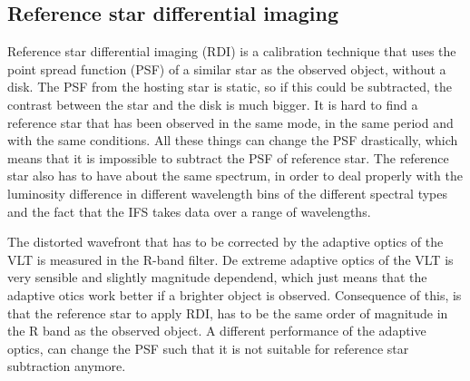 \documentclass[twoside,single]{lion-msc}
\begin{document}



\clearpage
\subsection*{Reference star differential imaging}
Reference star differential imaging (RDI) is a calibration technique that uses the point spread function (PSF) of a similar star as the observed object, without a disk. The PSF from the hosting star is static, so if this could be subtracted, the contrast between the star and the disk is much bigger. It is hard to find a reference star that has been observed in the same mode, in the same period and with the same conditions. All these things can change the PSF drastically, which means that it is impossible to subtract the PSF of reference star. The reference star also has to have about the same spectrum, in order to deal properly with the luminosity difference in different wavelength bins of the different spectral types and the fact that the IFS takes data over a range of wavelengths. 
\bigskip

The distorted wavefront that has to be corrected by the adaptive optics of the VLT is measured in the R-band filter. De extreme adaptive optics of the VLT is very sensible and slightly magnitude dependend, which just means that the adaptive otics work better if a brighter object is observed. Consequence of this, is that the reference star to apply RDI, has to be the same order of magnitude in the R band as the observed object. A different performance of the adaptive optics, can change the PSF such that it is not suitable for reference star subtraction anymore. 
\end{document}
